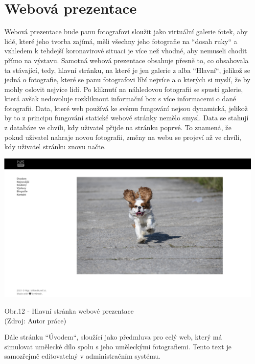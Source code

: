 \documentclass[12pt,a4paper]{report}
\begin{document}
  \chapter{Webová prezentace}
  Webová prezentace bude panu fotografovi sloužit jako virtuální galerie fotek, aby lidé, které jeho
  tvorba zajímá, měli všechny jeho fotografie na ``dosah ruky`` a vzhledem k tehdejší koronavirové
  situaci je více než vhodné, aby nemuseli chodit přímo na výstavu.
  Samotná webová prezentace obsahuje přesně to, co obsahovala ta stávající, tedy, hlavní stránku,
  na které je jen galerie z alba ``Hlavní``, jelikož se jedná o fotografie, které se panu fotografovi líbí
  nejvíce a o kterých si myslí, že by mohly oslovit nejvíce lidí. Po kliknutí na náhledovou fotografii se
  spustí galerie, která avšak nedovoluje rozkliknout informační box s více informacemi o dané
  fotografii.
  Data, které web používá ke svému fungování nejsou dynamická, jelikož by to z principu fungování
  statické webové stránky nemělo smysl. Data se stahují z databáze ve chvíli, kdy uživatel přijde na
  stránku poprvé. To znamená, že pokud uživatel nahraje novou fotografii, změny na webu se
  projeví až ve chvíli, kdy uživatel stránku znovu načte.

  \vspace*{0.5cm}
  \noindent\includegraphics[width=\linewidth]{dmp-bures.png}
  \begin{center}
    Obr.12 -  Hlavní stránka webové prezentace \\
    (Zdroj: Autor práce)
  \end{center}
  \vspace*{0.5cm}

  Dále stránku ``Úvodem``, sloužící jako předmluva pro celý web, který má simulovat umělecké
  dílo spolu s jeho uměleckými fotografiemi. Tento text je samozřejmě editovatelný v
  administračním systému.
  
\end{document}
